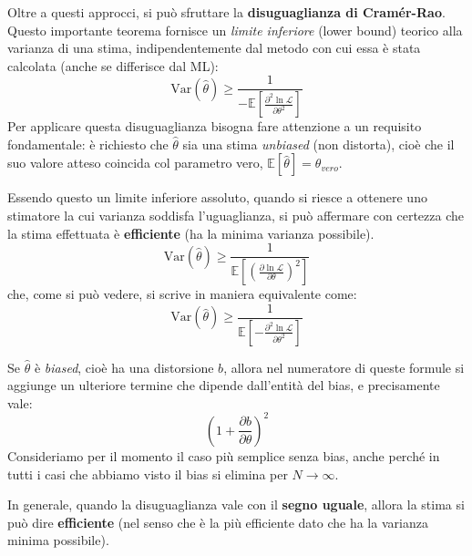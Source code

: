 \documentclass[openany,a4paper,12pt]{book}
\providecommand{\mathscr}[1]{\mathcal{#1}}
\theoremstyle{remark}
\begin{document}
Oltre a questi approcci, si può sfruttare la \textbf{disuguaglianza di Cramér-Rao}. Questo importante teorema fornisce un \textit{limite inferiore} (lower bound) teorico alla varianza di una stima, indipendentemente dal metodo con cui essa è stata calcolata (anche se differisce dal ML):
\begin{equation}
    \boxed{ \mathrm{Var}(\hat{\theta}) \geq \frac{1}{-\mathbb{E}\left[ \frac{\partial^2 \ln \mathscr{L}}{\partial \theta^2} \right]} }
\end{equation}
Per applicare questa disuguaglianza bisogna fare attenzione a un requisito fondamentale: è richiesto che $\hat{\theta}$ sia una stima \textit{unbiased} (non distorta), cioè che il suo valore atteso coincida col parametro vero, $\mathbb{E}[\hat{\theta}] = \theta_{vero}$.

Essendo questo un limite inferiore assoluto, quando si riesce a ottenere uno stimatore la cui varianza soddisfa l'uguaglianza, si può affermare con certezza che la stima effettuata è \textbf{efficiente} (ha la minima varianza possibile).
\begin{equation}
    \boxed{ \mathrm{Var}(\hat{\theta}) \geq \frac{1}{\mathbb{E}\left[ \left( \frac{\partial \ln \mathscr{L}}{\partial \theta} \right)^2 \right]} }
\end{equation}
che, come si può vedere, si scrive in maniera equivalente come:
\begin{equation}
    \boxed{ \mathrm{Var}(\hat{\theta}) \geq \frac{1}{\mathbb{E}\left[ -\frac{\partial^2 \ln \mathscr{L}}{\partial \theta^2} \right]} }
\end{equation}

Se $\hat{\theta}$ è \textit{biased}, cioè ha una distorsione $b$, allora nel numeratore di queste formule si aggiunge un ulteriore termine che dipende dall'entità del bias, e precisamente vale:
\begin{equation}
    \left( 1 + \frac{\partial b}{\partial \theta} \right)^2
\end{equation}
Consideriamo per il momento il caso più semplice senza bias, anche perché in tutti i casi che abbiamo visto il bias si elimina per $N \to \infty$.

In generale, quando la disuguaglianza vale con il \textbf{segno uguale}, allora la stima si può dire \textbf{efficiente} (nel senso che è la più efficiente dato che ha la varianza minima possibile).
\end{document}
